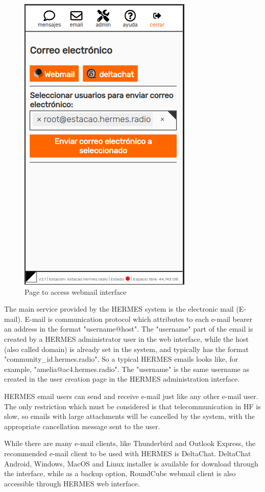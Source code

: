 \documentclass[11pt,a4paper]{article}
\begin{document}
\begin{figure}[H]
  \centering
  \includegraphics[width=0.5\columnwidth]{screenshots/frontend/es/email.png}
  \caption{Page to access webmail interface}
  \vspace{-10pt}
  \label{fig:webmail2}
\end{figure}

The main service provided by the HERMES system is the electronic mail (E-mail). E-mail is communication protocol which attributes to each e-mail bearer an address in the format "username@host". The "username" part of the email is created by a HERMES administrator user in the web interface, while the host (also called domain) is already set in the system, and typically has the format "community\_id.hermes.radio". So a typical HERMES emails looks like, for example, "amelia@ac4.hermes.radio". The "username" is the same username as created in the user creation page in the HERMES administration interface.

HERMES email users can send and receive e-mail just like any other e-mail user. The only restriction which must be considered is that telecommunication in HF is slow, so emails with large attachments will be cancelled by the system, with the appropriate cancellation message sent to the user.

While there are many e-mail clients, like Thunderbird and Outlook Express, the recommended e-mail client to be used with HERMES is DeltaChat. DeltaChat Android, Windows, MacOS and Linux installer is available for download through the interface, while as a backup option, RoundCube webmail client is also accessible through HERMES web interface.
\end{document}
